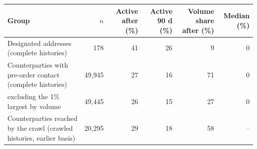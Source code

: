 \caption{\textbf{Counterparty persistence on complete histories.} Every undesignated address that transacted with one of the 178 in-window designated addresses before that address's order, dated by the earliest such order, with its full USDT history read from the archive node to 2025-01-01 and the designated addresses measured identically. Share active: any transfer after the order; 90 d: a transfer more than 90 days after it; volume share: the pooled group's USDT volume after the order over its volume in the window; median: the per-address share of volume after the order. The pooled volume share is carried by exchange-scale counterparties, so it is also given without the 1\% largest by volume. The last row is the earlier measure on crawled histories. The node and the per-address export agree on the designated addresses' transfer counts to within 1.3\% (\texttt{scripts/compute\_counterparty\_full.py}).}
\label{tab:counterparty-full}
\begin{tabular}{lrrrrr}
\toprule
\textbf{Group} & $n$ & \textbf{Active after (\%)} & \textbf{Active 90 d (\%)} & \textbf{Volume share after (\%)} & \textbf{Median (\%)} \\
\midrule
Designated addresses (complete histories) & 178 & 41 & 26 & 9 & 0 \\
Counterparties with pre-order contact (complete histories) & 49,945 & 27 & 16 & 71 & 0 \\
\quad excluding the 1\% largest by volume & 49,445 & 26 & 15 & 27 & 0 \\
Counterparties reached by the crawl (crawled histories, earlier basis) & 20,295 & 29 & 18 & 58 & -- \\
\bottomrule
\end{tabular}
